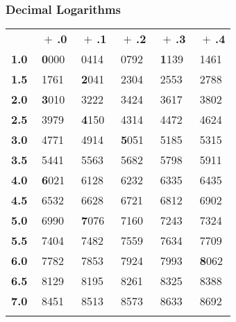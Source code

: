 \documentclass[11pt]{article}
\begin{document}
    \begin{center}
        \subsubsection*{Decimal Logarithms}
        \vspace{-0.5em}
        \footnotesize
        \def\arraystretch{0.95}
        \begin{tabular}{clllll}
            \rowcolor{CELL} \cellcolor{white}{\scriptsize\textbf{log}} &\textbf{$\;+\,$.0} &\textbf{$\;+\,$.1} &\textbf{$\;+\,$.2} &\textbf{$\;+\,$.3} &\textbf{$\;+\,$.4} \\\rowcolor{ROW}
            \cellcolor{CELL}\textbf{1.0} & $\;$\textbf{0}000 & $\;$0414 & $\;$0792 & $\;$\textbf{1}139 & $\;$1461\\\rowcolor{ROW}
            \cellcolor{CELL}\textbf{1.5} & $\;$1761 & $\;$\textbf{2}041 & $\;$2304 & $\;$2553 & $\;$2788\\
            \cellcolor{CELL}\textbf{2.0} & $\;$\textbf{3}010 & $\;$3222 & $\;$3424 & $\;$3617 & $\;$3802\\
            \cellcolor{CELL}\textbf{2.5} & $\;$3979 & $\;$\textbf{4}150 & $\;$4314 & $\;$4472 & $\;$4624\\\rowcolor{ROW}
            \cellcolor{CELL}\textbf{3.0} & $\;$4771 & $\;$4914 & $\;$\textbf{5}051 & $\;$5185 & $\;$5315\\\rowcolor{ROW}
            \cellcolor{CELL}\textbf{3.5} & $\;$5441 & $\;$5563 & $\;$5682 & $\;$5798 & $\;$5911\\
            \cellcolor{CELL}\textbf{4.0} & $\;$\textbf{6}021 & $\;$6128 & $\;$6232 & $\;$6335 & $\;$6435\\
            \cellcolor{CELL}\textbf{4.5} & $\;$6532 & $\;$6628 & $\;$6721 & $\;$6812 & $\;$6902\\\rowcolor{ROW}
            \cellcolor{CELL}\textbf{5.0} & $\;$6990 & $\;$\textbf{7}076 & $\;$7160 & $\;$7243 & $\;$7324\\\rowcolor{ROW}
            \cellcolor{CELL}\textbf{5.5} & $\;$7404 & $\;$7482 & $\;$7559 & $\;$7634 & $\;$7709\\
            \cellcolor{CELL}\textbf{6.0} & $\;$7782 & $\;$7853 & $\;$7924 & $\;$7993 & $\;$\textbf{8}062\\
            \cellcolor{CELL}\textbf{6.5} & $\;$8129 & $\;$8195 & $\;$8261 & $\;$8325 & $\;$8388\\\rowcolor{ROW}
            \cellcolor{CELL}\textbf{7.0} & $\;$8451 & $\;$8513 & $\;$8573 & $\;$8633 & $\;$8692\\\rowcolor{ROW}

\end{tabular}
\end{center}
\end{document}
